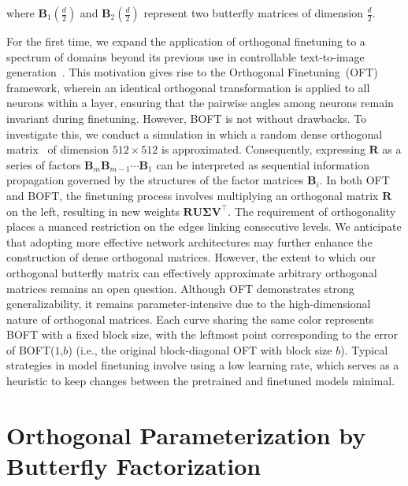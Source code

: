 where $\bm{B}_1(\frac{d}{2})$ and $\bm{B}_2(\frac{d}{2})$ represent two butterfly matrices of dimension $\frac{d}{2}$. \item For the first time, we expand the application of orthogonal finetuning to a spectrum of domains beyond its previous use in controllable text-to-image generation~\cite{qiu2023controlling}. This motivation gives rise to the Orthogonal Finetuning~(OFT)~\cite{qiu2023controlling} framework, wherein an identical orthogonal transformation is applied to all neurons within a layer, ensuring that the pairwise angles among neurons remain invariant during finetuning. However, BOFT is not without drawbacks. To investigate this, we conduct a simulation in which a random dense orthogonal matrix~\cite{anderson1987generation} of dimension $512\times 512$ is approximated. Consequently, expressing $\bm{R}$ as a series of factors $\bm{B}_m\bm{B}_{m-1}\cdots\bm{B}_1$ can be interpreted as sequential information propagation governed by the structures of the factor matrices $\bm{B}_i$. In both OFT and BOFT, the finetuning process involves multiplying an orthogonal matrix $\bm{R}$ on the left, resulting in new weights $\bm{R}\bm{U}\bm{\Sigma}\bm{V}^\top$. The requirement of orthogonality places a nuanced restriction on the edges linking consecutive levels. We anticipate that adopting more effective network architectures may further enhance the construction of dense orthogonal matrices. However, the extent to which our orthogonal butterfly matrix can effectively approximate arbitrary orthogonal matrices remains an open question. Although OFT demonstrates strong generalizability, it remains parameter-intensive due to the high-dimensional nature of orthogonal matrices. Each curve sharing the same color represents BOFT with a fixed block size, with the leftmost point corresponding to the error of BOFT($1$,$b$) (i.e., the original block-diagonal OFT with block size $b$). Typical strategies in model finetuning involve using a low learning rate, which serves as a heuristic to keep changes between the pretrained and finetuned models minimal. \section{Orthogonal Parameterization by Butterfly Factorization}

